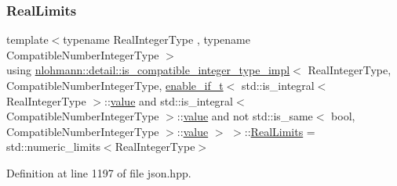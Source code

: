 \subsubsection{\texorpdfstring{RealLimits}{RealLimits}}
{\footnotesize\ttfamily template$<$typename Real\+Integer\+Type , typename Compatible\+Number\+Integer\+Type $>$ \\
using \mbox{\hyperlink{structnlohmann_1_1detail_1_1is__compatible__integer__type__impl}{nlohmann\+::detail\+::is\+\_\+compatible\+\_\+integer\+\_\+type\+\_\+impl}}$<$ Real\+Integer\+Type, Compatible\+Number\+Integer\+Type, \mbox{\hyperlink{namespacenlohmann_1_1detail_a02bcbc878bee413f25b985ada771aa9c}{enable\+\_\+if\+\_\+t}}$<$ std\+::is\+\_\+integral$<$ Real\+Integer\+Type $>$\+::\mbox{\hyperlink{structnlohmann_1_1detail_1_1is__compatible__integer__type__impl_3_01_real_integer_type_00_01_com5aa74bcf254245a639da00509f4d2655_a478242daac7a70e28c749bfec00d1c1b}{value}} and std\+::is\+\_\+integral$<$ Compatible\+Number\+Integer\+Type $>$\+::\mbox{\hyperlink{structnlohmann_1_1detail_1_1is__compatible__integer__type__impl_3_01_real_integer_type_00_01_com5aa74bcf254245a639da00509f4d2655_a478242daac7a70e28c749bfec00d1c1b}{value}} and not std\+::is\+\_\+same$<$ bool, Compatible\+Number\+Integer\+Type $>$\+::\mbox{\hyperlink{structnlohmann_1_1detail_1_1is__compatible__integer__type__impl_3_01_real_integer_type_00_01_com5aa74bcf254245a639da00509f4d2655_a478242daac7a70e28c749bfec00d1c1b}{value}} $>$ $>$\+::\mbox{\hyperlink{structnlohmann_1_1detail_1_1is__compatible__integer__type__impl_3_01_real_integer_type_00_01_com5aa74bcf254245a639da00509f4d2655_a0e9f2586c4de25750563770c9388ab9f}{Real\+Limits}} =  std\+::numeric\+\_\+limits$<$Real\+Integer\+Type$>$}



Definition at line 1197 of file json.\+hpp.




